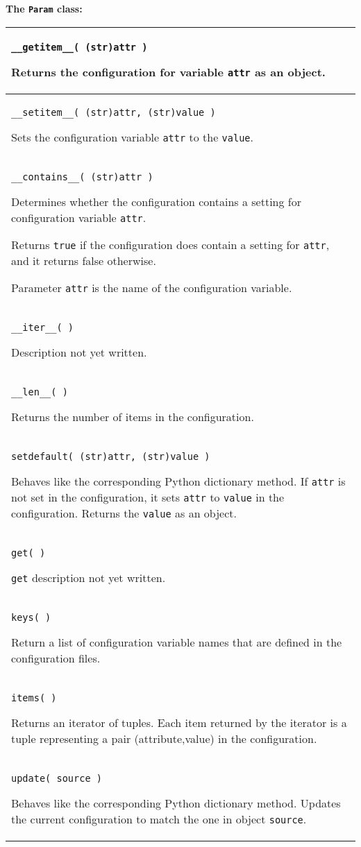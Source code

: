 \textbf{The \texttt{Param} class:}
\begin{flushleft}
\begin{longtable}{|p{16cm}|} \hline
\texttt{\_\_getitem\_\_( (str)attr )}

Returns the configuration for variable \texttt{attr}
as an object.
\\ \hline
\texttt{\_\_setitem\_\_( (str)attr, (str)value )}

Sets the configuration variable \texttt{attr} to the \texttt{value}.
\\ \hline
\texttt{\_\_contains\_\_( (str)attr )}

Determines whether the configuration contains a setting for 
configuration variable \texttt{attr}.

Returns \texttt{true} if the configuration does contain a
setting for \texttt{attr}, and it returns false otherwise.

Parameter \texttt{attr} is the name of the configuration variable.
\\ \hline
\texttt{\_\_iter\_\_( )}

Description not yet written.
\\ \hline
\texttt{\_\_len\_\_( )}

Returns the number of items in the configuration.
\\ \hline
\texttt{setdefault( (str)attr, (str)value )}

Behaves like the corresponding Python dictionary method.
If \texttt{attr} is not set in the configuration,
it sets \texttt{attr} to \texttt{value} in the configuration.
Returns the \texttt{value} as an object.
\\ \hline
\texttt{get( )}

\texttt{get} description
not yet written.
\\ \hline
\texttt{keys( )}

Return a list of configuration variable names that
are defined in the configuration files.
\\ \hline
\texttt{items( )}

Returns an iterator of tuples. 
Each item returned by the iterator is a tuple representing a pair 
(attribute,value) in the configuration.
\\ \hline
\texttt{update( source )}

Behaves like the corresponding Python dictionary method.
Updates the current configuration to match the one in object 
\texttt{source}.
\\ \hline

\end{longtable}
\end{flushleft}

